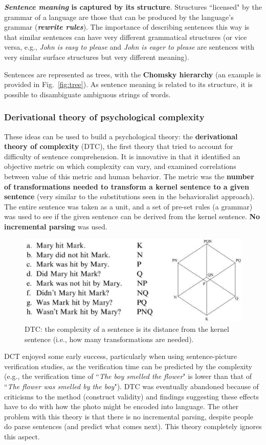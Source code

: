 \textbf{\textit{Sentence meaning} is captured by its structure}. Structures ``licensed" by the grammar of a language are those that can be produced by the language's grammar (\textbf{\textit{rewrite rules}}). The importance of describing sentences this way is that similar sentences can have very different grammatical structures (or vice versa, e.g., \textit{John is easy to please} and \textit{John is eager to please} are sentences with very similar surface structures but very different meaning).

Sentences are represented as trees, with the \textbf{Chomsky hierarchy} (an example is provided in Fig.~\ref{fig:tree}). As sentence meaning is related to its structure, it is possible to disambiguate ambiguous strings of words.

\subsubsection{Derivational theory of psychological complexity}
These ideas can be used to build a psychological theory: the \textbf{derivational theory of complexity} (DTC), the first theory that tried to account for difficulty of sentence comprehension. It is innovative in that it identified an objective metric on which complexity can vary, and examined correlations between value of this metric and human behavior. The metric was the \textbf{number of transformations needed to transform a kernel sentence to a given sentence} (very similar to the substitutions seen in the behavioralist approach). The entire sentence was taken as a unit, and a set of pre-set rules (a grammar) was used to see if the given sentence can be derived from the kernel sentence. \textbf{No incremental parsing} was used.

\begin{figure}[!ht]
    \centering
    \captionsetup{width=.8\linewidth}
    \includegraphics[width=0.5\linewidth]{images/dtc.png}
    \caption*{DTC: the complexity of a sentence is its distance from the kernel sentence (i.e., how many transformations are needed).}
    \label{fig:dtc}
\end{figure}

DCT enjoyed some early success, particularly when using sentence-picture verification studies, as the verification time can be predicted by the complexity (e.g., the verification time of ``\textit{The boy smelled the flower}" is lower than that of ``\textit{The flower was smelled by the boy}").
DTC was eventually abandoned because of criticisms to the method (construct validity) and findings suggesting these effects have to do with how the photo might be encoded into language. The other problem with this theory is that there is no incremental parsing, despite people do parse sentences (and predict what comes next). This theory completely ignores this aspect.

